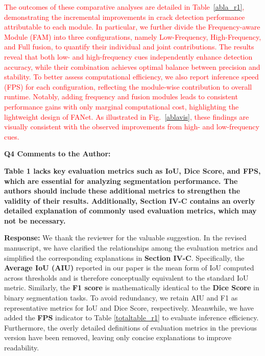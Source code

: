 \documentclass[lettersize,journal,onecolumn,12pt]{IEEEtran}
\begin{document}
\textcolor{red}{The outcomes of these comparative analyses are detailed in Table~\ref{abla_r1}, demonstrating the incremental improvements in crack detection performance attributable to each module.}
\textcolor{red}{
In particular, we further divide the Frequency-aware Module (FAM) into three configurations, namely Low-Frequency, High-Frequency, and Full fusion, to quantify their individual and joint contributions.
The results reveal that both low- and high-frequency cues independently enhance detection accuracy, while their combination achieves optimal balance between precision and stability.
To better assess computational efficiency, we also report inference speed (FPS) for each configuration, reflecting the module-wise contribution to overall runtime.
Notably, adding frequency and fusion modules leads to consistent performance gains with only marginal computational cost, highlighting the lightweight design of FANet.}
\textcolor{red}{As illustrated in Fig.~\ref{ablavis}, these findings are visually consistent with the observed improvements from high- and low-frequency cues.}\\ [10pt]






{\color{BlueGreen} \textbf{Q4 Comments to the Author:}

\textbf{Table 1 lacks key evaluation metrics such as IoU, Dice Score, and FPS, which are essential for analyzing segmentation performance. The authors should include these additional metrics to strengthen the validity of their results. Additionally, Section IV-C contains an overly detailed explanation of commonly used evaluation metrics, which may not be necessary.}} 

\textbf{Response:}
We thank the reviewer for the valuable suggestion. 
In the revised manuscript, we have clarified the relationships among the evaluation metrics and simplified the corresponding explanations in \textbf{Section IV-C}. 
Specifically, the \textbf{Average IoU (AIU)} reported in our paper is the mean form of IoU computed across thresholds and is therefore conceptually equivalent to the standard IoU metric. 
Similarly, the \textbf{F1 score} is mathematically identical to the \textbf{Dice Score} in binary segmentation tasks. 
To avoid redundancy, we retain AIU and F1 as representative metrics for IoU and Dice Score, respectively.  
Meanwhile, we have added the \textbf{FPS} indicator to Table \ref{totaltable_r1} to evaluate inference efficiency.  
Furthermore, the overly detailed definitions of evaluation metrics in the previous version have been removed, leaving only concise explanations to improve readability.
\end{document}
